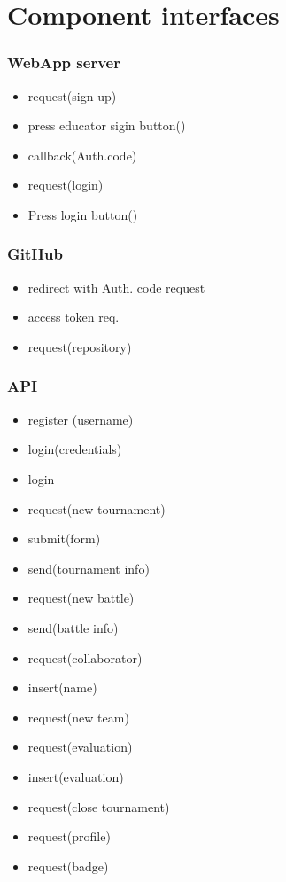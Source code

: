 \section{ Component interfaces}

    \subsubsection{WebApp server}
    \begin{itemize}
        \item request(sign-up)
        \item press educator sigin button()
        \item callback(Auth.code)
        \item request(login)
        \item Press login button()
    \end{itemize}
    
    \subsubsection{GitHub}
    \begin{itemize}
        \item redirect with Auth. code request
        \item access token req.
        \item request(repository)
    \end{itemize}
    
    \subsubsection{API}
    \begin{itemize}
        \item register (username)
        \item login(credentials)
        \item login
        \item request(new tournament)
        \item submit(form)
        \item send(tournament info)
        \item request(new battle)
        \item send(battle info)
        \item request(collaborator)
        \item insert(name)
        \item request(new team)
        \item request(evaluation)
        \item insert(evaluation)
        \item request(close tournament)
        \item request(profile)
        \item request(badge)
    \end{itemize}
    
